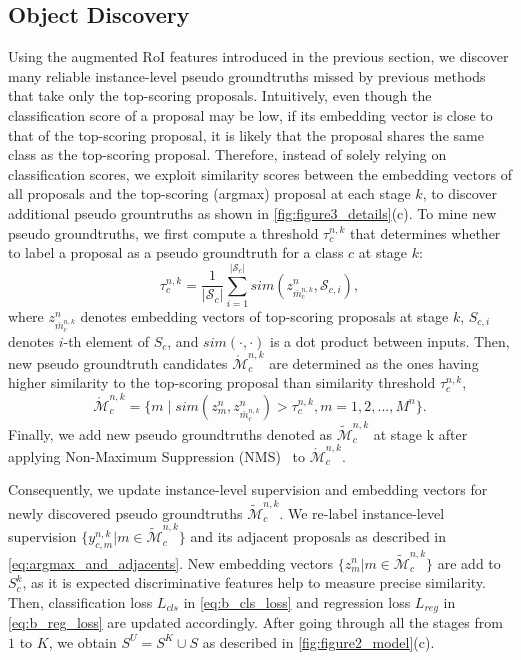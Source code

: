 \documentclass[runningheads]{llncs}
\begin{document}
\subsection{Object Discovery}
Using the augmented RoI features introduced in the previous section, we discover many reliable instance-level pseudo groundtruths missed by previous methods that take only the top-scoring proposals.
Intuitively, even though the classification score of a proposal may be low, if its embedding vector is close to that of the top-scoring proposal, it is likely that the proposal shares the same class as the top-scoring proposal.
Therefore, instead of solely relying on classification scores, we exploit similarity scores between the embedding vectors of all proposals and the top-scoring (argmax) proposal at each stage $k$, to discover additional pseudo grountruths as shown in \cref{fig:figure3_details}(c).
To mine new pseudo groundtruths, we first compute a threshold $\tau^{n,k}_c$ that determines whether to label a proposal as a pseudo groundtruth for a class $c$ at stage $k$:
\begin{equation}
    \tau^{n,k}_c = \frac{1}{|\mathcal{S}_c|}\sum^{|\mathcal{S}_c|}_{i=1}{sim(z^{n}_{\bar{m}^{n,k}_c}, \mathcal{S}_{c,i})}
\label{eq:object_discovery_threshold}
,\end{equation}
where $z^{n}_{\bar{m}^{n,k}_c}$ denotes embedding vectors of top-scoring proposals at stage $k$, $S_{c,i}$ denotes $i$-th element of $S_c$, and $sim(\cdot,\cdot)$ is a dot product between inputs.
Then, new pseudo groundtruth candidates $\acute{\mathcal{M}}^{n,k}_c$ are determined as the ones having higher similarity to the top-scoring proposal than similarity threshold $\tau^{n,k}_c$, 
\begin{equation}    
    \acute{\mathcal{M}}^{n,k}_c = \{m \mid sim(z^{n}_m, z^{n}_{\bar{m}^{n,k}_c}) > \tau^{n,k}_c, m=1, 2, ...,M^n \}.
    \label{eq:PGT_discovery}
\end{equation}
Finally, we add new pseudo groundtruths denoted as $\tilde{\mathcal{M}}^{n,k}_c$ at stage k after applying Non-Maximum Suppression (NMS)~\cite{rosenfeld1971edge} to $\acute{\mathcal{M}}^{n,k}_c$. 












Consequently, we update instance-level supervision and embedding vectors for newly discovered pseudo groundtruths $\tilde{\mathcal{M}}^{n,k}_c$.
We re-label instance-level supervision $\{ y^{n,k}_{c,m} | m \in \tilde{\mathcal{M}}^{n,k}_c \}$ and its adjacent proposals as described in \eqref{eq:argmax_and_adjacents}.
New embedding vectors $\{ z^{n}_{m} | m \in \tilde{\mathcal{M}}^{n,k}_c \}$ are add to $S^k_c$, as it is expected discriminative features help to measure precise similarity.
Then, classification loss $L_{cls}$ in \eqref{eq:b_cls_loss} and regression loss $L_{reg}$ in \eqref{eq:b_reg_loss} are updated accordingly.
After going through all the stages from $1$ to $K$, we obtain $S^U = S^K \cup S$ as described in \cref{fig:figure2_model}(c).
\end{document}

